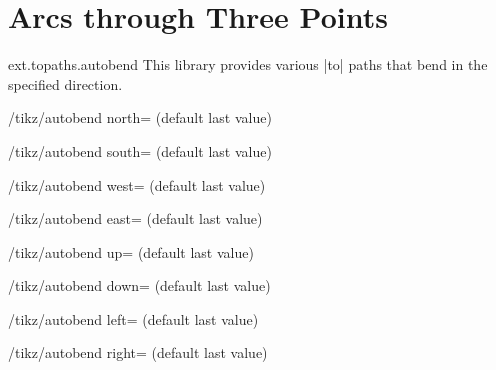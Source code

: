 %
%
%

\section{Arcs through Three Points}
\label{library:topaths.autobend}
\begin{tikzlibrary}{ext.topaths.autobend}
  This library provides various |to| paths
  that bend in the specified direction.
  
\end{tikzlibrary}

\begin{key}{/tikz/autobend north= (default \normalfont last value)}
\end{key}
\begin{key}{/tikz/autobend south= (default \normalfont last value)}
\end{key}
\begin{key}{/tikz/autobend west= (default \normalfont last value)}
\end{key}
\begin{key}{/tikz/autobend east= (default \normalfont last value)}
\end{key}

\begin{key}{/tikz/autobend up= (default \normalfont last value)}
\end{key}
\begin{key}{/tikz/autobend down= (default \normalfont last value)}
\end{key}
\begin{key}{/tikz/autobend left= (default \normalfont last value)}
\end{key}
\begin{key}{/tikz/autobend right= (default \normalfont last value)}
\end{key}

